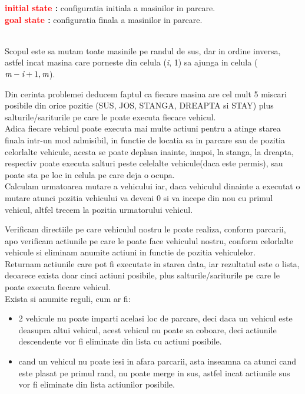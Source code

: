 \documentclass{article}
\begin{document}
\quad
\begin{center}
  \textbf{\textcolor{red}{initial state} :} configuratia initiala a masinilor in parcare.\\ 
  \textbf{\textcolor{red}{goal state} :} configuratia finala a masinilor in parcare.\par
  \quad \\ Scopul este sa mutam toate masinile pe randul de sus, dar in ordine inversa, astfel incat masina care porneste din celula (\emph i, 1) sa ajunga
  in celula (\(\emph m - \emph i + 1, \emph m \)).\par
\end{center}
\newpage
\quad Din cerinta problemei deducem faptul ca fiecare masina are cel mult 5 miscari posibile din orice pozitie (SUS, JOS, STANGA, DREAPTA si STAY) plus salturile/sariturile pe care le poate executa fiecare vehicul. \\ Adica fiecare vehicul poate executa mai multe actiuni pentru a atinge starea finala intr-un mod admisibil, in functie de locatia sa in parcare sau de pozitia celorlalte vehicule, acesta se poate deplasa inainte, inapoi, la stanga, la dreapta, respectiv poate executa salturi peste celelalte vehicule(daca este permis), sau poate sta pe loc in celula pe care deja o ocupa.\\ Calculam urmatoarea mutare a vehicului iar, daca vehiculul dinainte a executat o mutare atunci pozitia vehicului va deveni 0 si va incepe din nou cu primul vehicul, altfel trecem la pozitia urmatorului vehicul. \\\par
\quad Verificam directiile pe care vehiculul nostru le poate realiza, conform parcarii, apo verificam actiunile pe care le poate face vehiculul nostru, conform celorlalte vehicule si eliminam anumite actiuni in functie de pozitia vehiculelor.\\ Returnam actiunile care pot fi executate in starea data, iar rezultatul este o lista, deoarece exista doar cinci actiuni posibile, plus salturile/sariturile pe care le poate executa fiecare vehicul.\\ Exista si anumite reguli, cum ar fi: \\
\begin{itemize}
    \item 2 vehicule nu poate imparti acelasi loc de parcare, deci daca un vehicul
    este deasupra altui vehicul, acest vehicul nu poate sa coboare, deci
    actiunile descendente vor fi eliminate din lista cu actiuni posibile.
    \item cand un vehicul nu poate iesi in afara parcarii, asta inseamna ca atunci cand este plasat pe primul rand, nu poate merge in sus, astfel incat actiunile sus vor fi eliminate din lista actiunilor posibile.
\end{itemize}
\end{document}
